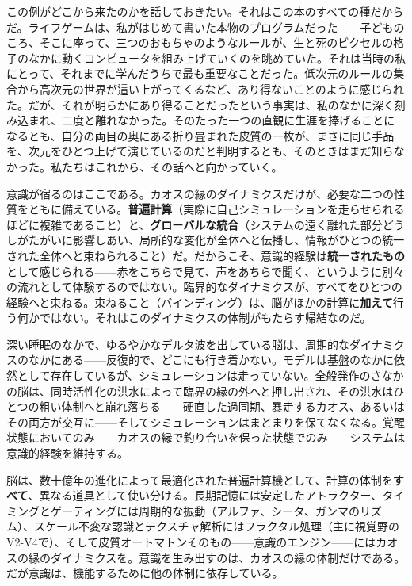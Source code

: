 \documentclass[11pt, twoside, openright]{book}
\begin{document}
この例がどこから来たのかを話しておきたい。それはこの本のすべての種だからだ。ライフゲームは、私がはじめて書いた本物のプログラムだった------子どものころ、そこに座って、三つのおもちゃのようなルールが、生と死のピクセルの格子のなかに動くコンピュータを組み上げていくのを眺めていた。それは当時の私にとって、それまでに学んだうちで最も重要なことだった。低次元のルールの集合から高次元の世界が這い上がってくるなど、あり得ないことのように感じられた。だが、それが明らかにあり得ることだったという事実は、私のなかに深く刻み込まれ、二度と離れなかった。そのたった一つの直観に生涯を捧げることになるとも、自分の両目の奥にある折り畳まれた皮質の一枚が、まさに同じ手品を、次元をひとつ上げて演じているのだと判明するとも、そのときはまだ知らなかった。私たちはこれから、その話へと向かっていく。

意識が宿るのはここである。カオスの縁のダイナミクスだけが、必要な二つの性質をともに備えている。\textbf{普遍計算}（実際に自己シミュレーションを走らせられるほどに複雑であること）と、\textbf{グローバルな統合}（システムの遠く離れた部分どうしがたがいに影響しあい、局所的な変化が全体へと伝播し、情報がひとつの統一された全体へと束ねられること）だ。だからこそ、意識的経験は\textbf{統一されたもの}として感じられる------赤をこちらで見て、声をあちらで聞く、というように別々の流れとして体験するのではない。臨界的なダイナミクスが、すべてをひとつの経験へと束ねる。束ねること（バインディング）は、脳がほかの計算に\textbf{加えて}行う何かではない。それはこのダイナミクスの体制がもたらす帰結なのだ。

深い睡眠のなかで、ゆるやかなデルタ波を出している脳は、周期的なダイナミクスのなかにある------反復的で、どこにも行き着かない。モデルは基盤のなかに依然として存在しているが、シミュレーションは走っていない。全般発作のさなかの脳は、同時活性化の洪水によって臨界の縁の外へと押し出され、その洪水はひとつの粗い体制へと崩れ落ちる------硬直した過同期、暴走するカオス、あるいはその両方が交互に------そしてシミュレーションはまとまりを保てなくなる。覚醒状態においてのみ------カオスの縁で釣り合いを保った状態でのみ------システムは意識的経験を維持する。

脳は、数十億年の進化によって最適化された普遍計算機として、計算の体制を\textbf{すべて}、異なる道具として使い分ける。長期記憶には安定したアトラクター、タイミングとゲーティングには周期的な振動（アルファ、シータ、ガンマのリズム）、スケール不変な認識とテクスチャ解析にはフラクタル処理（主に視覚野のV2-V4で）、そして皮質オートマトンそのもの------意識のエンジン------にはカオスの縁のダイナミクスを。意識を生み出すのは、カオスの縁の体制だけである。だが意識は、機能するために他の体制に依存している。
\end{document}
